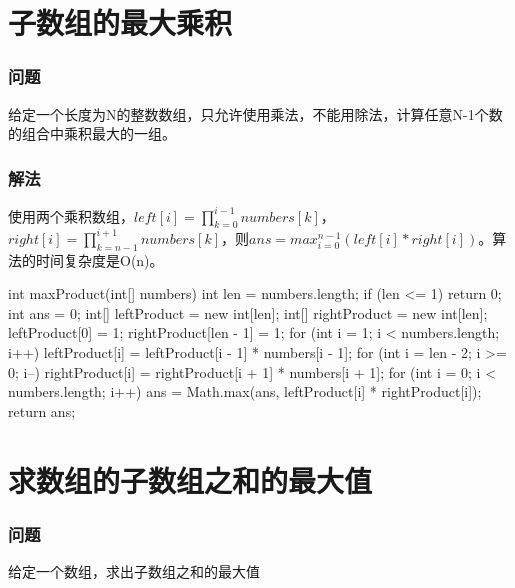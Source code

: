 \section{子数组的最大乘积} %
\label{sec:max-product}

\subsubsection{问题}
给定一个长度为N的整数数组，只允许使用乘法，不能用除法，计算任意N-1个数的组合中乘积最大的一组。

\subsubsection{解法}
使用两个乘积数组，$left[i]=\prod_{k=0}^{i-1}numbers[k]$，$right[i]=\prod_{k=n-1}^{i+1}numbers[k]$，则$ans = max_{i=0}^{n-1}(left[i]*right[i])$。算法的时间复杂度是O(n)。

\begin{Codex}[label={[$O(n)+O(n)$]Chap02_13_MaxProduct.java}]
	int maxProduct(int[] numbers) {
		int len = numbers.length;
		if (len <= 1) {
			return 0;
		}
		int ans = 0;
		int[] leftProduct = new int[len];
		int[] rightProduct = new int[len];
		leftProduct[0] = 1;
		rightProduct[len - 1] = 1;
		for (int i = 1; i < numbers.length; i++) {
			leftProduct[i] = leftProduct[i - 1] * numbers[i - 1];
		}
		for (int i = len - 2; i >= 0; i--) {
			rightProduct[i] = rightProduct[i + 1] * numbers[i + 1];
		}
		for (int i = 0; i < numbers.length; i++) {
			ans = Math.max(ans, leftProduct[i] * rightProduct[i]);
		}
		return ans;
	}
\end{Codex}

\section{求数组的子数组之和的最大值} %
\label{sec:max-sum}

\subsubsection{问题}
给定一个数组，求出子数组之和的最大值

